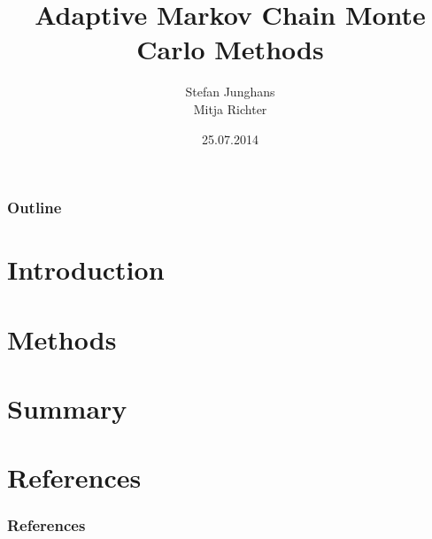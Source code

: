 \documentclass{beamer}
\title{Adaptive Markov Chain Monte Carlo Methods}
\author{Stefan Junghans\\ Mitja Richter}
\institute[Universities of]
{
TU Berlin
}
\date{25.07.2014}
\begin{document}
\begin{frame}
\titlepage
\end{frame}

\begin{frame}
\frametitle{Outline}
\tableofcontents
\end{frame}


\section{Introduction}







\section{Methods}



 



\section{Summary}

 
\section{References}
\nocite{*}
\begin{frame}[allowframebreaks]
        \frametitle{References}
        
         
\end{frame}
\end{document}
